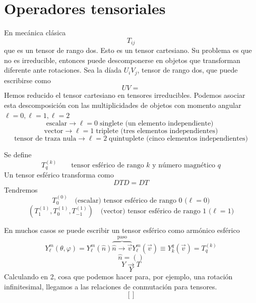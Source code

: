 \documentclass[10pt,oneside]{CBFT_book}
\begin{document}
\section{Operadores tensoriales}

En mecánica clásica 
\[
	T_{ij} 
\]
que es un tensor de rango dos. Esto es un tensor cartesiano. Su problema es que no es irreducible, entonces 
puede 
descomponerse en objetos que transforman diferente ante rotaciones. Sea la díada $U_iV_j$, tensor de rango 
dos, que 
puede escribirse como 
\[
	UV =
\]
Hemos reducido el tensor cartesiano en tensores irreducibles. Podemos asociar esta descomposición con las 
multiplicidades de objetos con momento angular $\ell=0, \ell=1, \ell=2$
\[
	\text{escalar} \longrightarrow \ell=0 \; \text{singlete (un elemento independiente) }
\]
\[
	\text{vector} \longrightarrow \ell=1 \; \text{triplete (tres elementos independientes)}
\]
\[
	\text{tensor de traza nula} \longrightarrow \ell=2 \; \text{quintuplete (cinco elementos 
independientes)}
\]

Se define 
\[
	T^{(k)}_q \qquad \text{tensor esférico de rango $k$ y número magnético $q$}
\]
Un tensor esférico transforma como 
\[
	D T D = D T 
\]
Tendremos 
\[
	T^{(0)}_0 \quad \text{(escalar) tensor esférico de rango 0 ($\ell=0$)}
\]
\[
	(T^{(1)}_1,T^{(1)}_0,T^{(1)}_{-1}) \quad \text{(vector) tensor esférico de rango 1 ($\ell=1$)}
\]

En muchos casos se puede escribir un tensor esférico como armónico esférico 
\[
	Y_\ell^{m}(\theta,\varphi) = Y_\ell^{m}(\hat{n})  \overbrace{\hat{n} \longrightarrow 
	\vec{v}}^{\text{paso}} Y_\ell^m(\vec{v}) \equiv Y_k^q(\vec{v}) = T_q^{(k)}
\]
\[
	\hat{n} = ()
\]
\[
	Y \longrightarrow T
\]
\[
	Y
\]
Calculando en 2, cosa que podemos hacer para, por ejemplo, una rotación infinitesimal, llegamos a las 
relaciones de conmutación para tensores.
\[
	[]
\]



\end{document}
